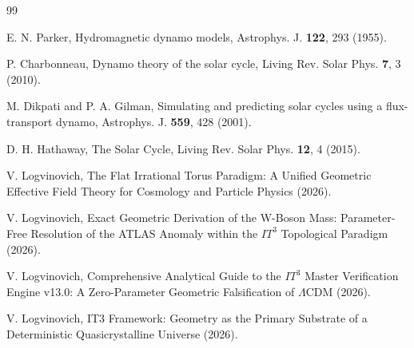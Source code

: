 \documentclass[aps, prd, onecolumn, 11pt, longbibliography, amsmath, amssymb]{revtex4-2}
\begin{document}
\begin{thebibliography}{99}

 E. N. Parker, Hydromagnetic dynamo models, Astrophys. J. \textbf{122}, 293 (1955).

 P. Charbonneau, Dynamo theory of the solar cycle, Living Rev. Solar Phys. \textbf{7}, 3 (2010).

 M. Dikpati and P. A. Gilman, Simulating and predicting solar cycles using a flux-transport dynamo, Astrophys. J. \textbf{559}, 428 (2001).

 D. H. Hathaway, The Solar Cycle, Living Rev. Solar Phys. \textbf{12}, 4 (2015).

 V. Logvinovich, The Flat Irrational Torus Paradigm: A Unified Geometric Effective Field Theory for Cosmology and Particle Physics (2026).

 V. Logvinovich, Exact Geometric Derivation of the W-Boson Mass: Parameter-Free Resolution of the ATLAS Anomaly within the $IT^3$ Topological Paradigm (2026).

 V. Logvinovich, Comprehensive Analytical Guide to the $IT^3$ Master Verification Engine v13.0: A Zero-Parameter Geometric Falsification of $\Lambda$CDM (2026).

 V. Logvinovich, IT3 Framework: Geometry as the Primary Substrate of a Deterministic Quasicrystalline Universe (2026).

\end{thebibliography}
\end{document}
